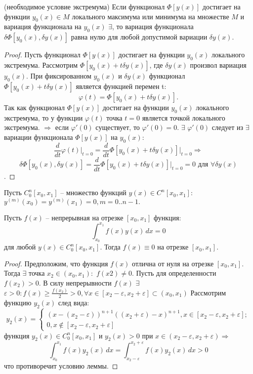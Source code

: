 \begin{theorem}(необходимое условие экстремума)
    Если функционал $\Phi[y(x)]$ достигает на функции
    $y_0(x) \in M$ локального максимума или минимума на множестве $M$ и
    вариация функционала на $y_0(x)$ $\exists$, то вариация функционала $\delta\Phi[y_0(x), \delta y(x)]$ равна нулю для любой допустимой вариации $\delta y(x)$.
\end{theorem}
\begin{proof}
    Пусть функционал $\Phi[y(x)]$ достигает на функции
    $y_0(x)$ локального экстремума. Рассмотрим $\Phi[y_0(x) + t\delta y(x)]$, где $\delta y(x)$
    произвол вариация $y_0(x)$. При фиксированном $y_0(x)$ и $\delta y(x)$ функционал 
    $\Phi[y_0(x) + t\delta y(x)]$ является функцией перемен t:
    $$\varphi(t) = \Phi[y_0(x) + t\delta y(x)].$$
    Так как функционал $\Phi[y(x)]$ достигает на функции $y_0(x)$ локального
    экстремума, то у функции $\varphi(t)$ точка $t=0$ является точкой локального экстремума. $\Longrightarrow$ если $\varphi'(0)$ существует, то
    $\varphi'(0)=0$. $\exists$ $\varphi'(0)$ следует из $\exists$ вариации функционала $\Phi[y(x)]$ на $y_0(x)$: $$\frac{d}{dt}\varphi(t)\Big|_{t=0}=\frac{d}{dt}\Phi[y_0(x)+t\delta y(x)]\Big|_{t=0} \Longrightarrow$$
    $$\delta \Phi[y_0(x), \delta y(x)]=\frac{d}{dt}\Phi[y_0(x)+t\delta y(x)]\Big|_{t=0}=0 \text{ для } \forall \delta y(x)$$.
\end{proof}
Пусть $C^n_0 [x_0, x_1]$ -- множество функций $y(x)\in C^n[x_0, x_1]:$ $y^{(m)}(x_0)=y^{(m)}(x_1)=0, m=0..n-1.$

\begin{lemma}
    Пусть $f(x)$ – непрерывная на отрезке $[x_0, x_1]$ функция: 
    $$ \int_{x_0}^{x_1} f(x)y(x) \,dx=0$$
    для любой $y(x) \in C^n_0[x_0, x_1]$. Тогда $f(x) \equiv 0$ на отрезке $[x_0, x_1]$.
\end{lemma}
\begin{proof}
    Предположим, что функция $f(x)$ отлична от нуля на
    отрезке $[x_0, x_1]$. Тогда $\exists$ точка $x_2 \in (x_0, x_1):$ $f(x2)\neq0$. Пусть для определенности $f(x_2)>0$. В силу непрерывности $f(x)$ $\exists$ $\varepsilon > 0: f(x)\geq \frac{f(x_2)}{2}>0, \forall x \in [x_2 - \varepsilon, x_2 + \varepsilon] \subset (x_0, x_1)$
    Рассмотрим функцию $y_2(x)$ след вида: 
    $$y_2(x)=\begin{cases} (x-(x_2-\varepsilon))^{n+1}((x_2+\varepsilon)-x)^{n+1}, x\in[x_2-\varepsilon, x_2+\varepsilon]; \\ 0,  x\notin[x_2-\varepsilon, x_2+\varepsilon] \end{cases}$$
    функция $y_2(x) \in C^n_0[x_0, x_1]$ и $ y_2(x) > 0$ при $x\in(x_2 - \varepsilon, x_2 + \varepsilon) \Longrightarrow$
    $$\int_{x_0}^{x_1} f(x)y_2(x) \,dx=\int_{x_2-\varepsilon}^{x_2+\varepsilon} f(x)y_2(x) \,dx>0$$ что противоречит условию леммы.
\end{proof}

